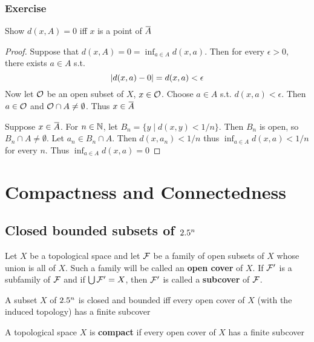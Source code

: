\documentclass[11pt]{article}
\begin{document}
\subsubsection{Exercise}
\label{sec:org29e8573}
\begin{exercise}
\label{ex2.4.27}
Show \(d(x,A)=0\) iff \(x\) is a point of \(\bbar{A}\)
\end{exercise}

\begin{proof}
Suppose that \(d(x,A)=0=\inf_{a\in A}d(x,a)\). Then for every \(\epsilon>0\), there
exists \(a\in A\) s.t.
\begin{equation*}
\abs{d(x,a)-0}=d(x,a)<\epsilon
\end{equation*}
Now let \(\mathcal{O}\) be an open subset of \(X\), \(x\in\mathcal{O}\). Choose \(a\in
    A\) s.t. \(d(x,a)<\epsilon\). Then \(a\in\mathcal{O}\) and \(\mathcal{O}\cap
    A\neq\emptyset\). Thus \(x\in\bbar{A}\)

Suppose \(x\in\bbar{A}\). For \(n\in\mathbb{N}\), let \(B_n=\{y\mid d(x,y)<1/n\}\).
Then \(B_n\) is open, so \(B_n\cap A\neq\emptyset\). Let \(a_n\in B_n\cap
    A\). Then \(d(x,a_n)<1/n\) thus \(\inf_{a\in A}d(x,a)<1/n\) for every \(n\).
Thus \(\inf_{a\in A}d(x,a)=0\)
\end{proof}

\section{Compactness and Connectedness}
\label{sec:orgeb2fe19}

\subsection{Closed bounded subsets of \(2.5^n\)}
\label{sec:org522131c}
Let \(X\) be a topological space and let \(\mathcal{F}\) be a family of open
subsets of \(X\) whose union is all of \(X\). Such a family will be called an
\textbf{open cover} of \(X\). If \(\mathcal{F}'\) is a subfamily of \(\mathcal{F}\) and if
\(\bigcup\mathcal{F}'=X\), then \(\mathcal{F}'\) is called a \textbf{subcover} of \(\mathcal{F}\).

\begin{theorem}[]
\label{thm3.1}
A subset \(X\) of \(2.5^n\) is closed and bounded iff every open cover of
\(X\) (with the induced topology) has a finite subcover
\end{theorem}

\begin{definition}[]
A topological space \(X\) is \textbf{compact} if every open cover of \(X\) has a
finite subcover
\end{definition}
\end{document}

